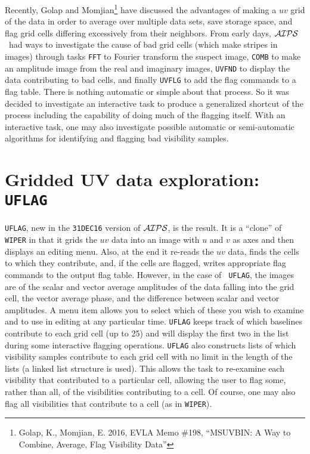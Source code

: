 \documentclass[twoside]{article}
\newcommand{\AIPS}{{$\cal AIPS\/$}}
\begin{document}
Recently, Golap and Momjian\footnote{Golap, K., Momjian, E. 2016, EVLA
  Memo \#198, ``MSUVBIN: A Way to Combine, Average, Flag Visibility
  Data''}  have discussed the advantages of making a $uv$ grid of the
data in order to average over multiple data sets, save storage space,
and flag grid cells differing excessively from their neighbors.  From
early days, \AIPS\ had ways to investigate the cause of bad grid cells
(which make stripes in images) through tasks {\tt FFT} to Fourier
transform the suspect image, {\tt COMB} to make an amplitude image
from the real and imaginary images, {\tt UVFND} to display the data
contributing to bad cells, and finally {\tt UVFLG} to add the flag
commands to a flag table.  There is nothing automatic or simple about
that process.  So it was decided to investigate an interactive task to
produce a generalized shortcut of the process including the capability
of doing much of the flagging itself.  With an interactive task, one
may also investigate possible automatic or semi-automatic algorithms
for identifying and flagging bad visibility samples.

\vfill\eject

\section{Gridded UV data exploration: {\tt UFLAG}}

{\tt UFLAG}, new in the {\tt 31DEC16} version of \AIPS, is the result.
It is a ``clone'' of {\tt WIPER} in that it grids the $uv$ data into
an image with $u$ and $v$ as axes and then displays an editing menu.
Also, at the end it re-reads the $uv$ data, finds the cells to which
they contribute, and, if the cells are flagged, writes appropriate
flag commands to the output flag table.  However, in the case of {\tt
  UFLAG}, the images are of the scalar and vector average amplitudes
of the data falling into the grid cell, the vector average phase, and
the  difference between scalar and vector amplitudes.  A menu item
allows you to select which of these you wish to examine and to use in
editing at any particular time.  {\tt UFLAG} keeps track of which
baselines contribute to each grid cell (up to 25) and will display the
first two in the list during some interactive flagging operations.
{\tt UFLAG} also constructs lists of which visibility samples
contribute to each grid cell with no limit in the length of the lists
(a linked list structure is used).  This allows the task to re-examine
each visibility that contributed to a particular cell, allowing the
user to flag some, rather than all, of the visibilities contributing
to a cell.  Of course, one may also flag all visibilities that
contribute to a cell (as in {\tt WIPER})\@.
\end{document}
